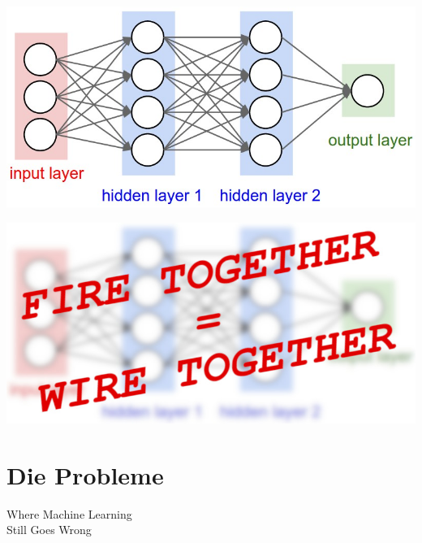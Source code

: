 \documentclass[aspectratio=169,x11names]{beamer}
\begin{document}
\begin{frame}
\begin{center}
\includegraphics[width=\textwidth]{images/simple_neural_network_header.jpg} 
\end{center}
\end{frame}

\begin{frame}
\begin{center}
\includegraphics[width=\textwidth]{images/simple_neural_network_header_FW.jpg} 
\end{center}
\end{frame}



\section{Die Probleme}

\begin{frame}
\begin{center}
\huge
Where Machine Learning\\ Still Goes Wrong
\end{center}
\end{frame}
\end{document}
